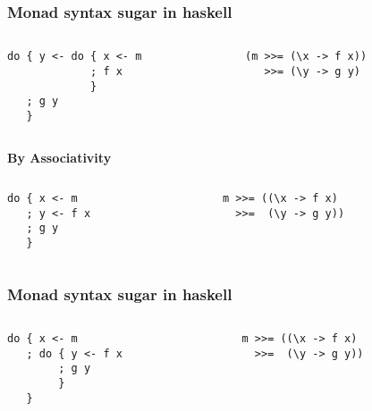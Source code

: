 \documentclass{beamer}
\begin{document}
\begin{frame}[fragile]
\frametitle{Monad syntax sugar in haskell}
\vspace{-0.5cm}
\begin{columns}[t]
  \begin{column}{5cm}
\begin{lstlisting}
do { y <- do { x <- m
             ; f x
             }
   ; g y 
   }
\end{lstlisting}
  \end{column}
  \begin{column}{5cm}
\begin{lstlisting}
(m >>= (\x -> f x)) 
   >>= (\y -> g y)
\end{lstlisting}
  \end{column}
\end{columns}

\pause

\begin{center}
\textbf{By Associativity}
\end{center}

\vspace{-0.5cm}
\begin{columns}[t]
  \begin{column}{5cm}
{
\begin{lstlisting}
do { x <- m
   ; y <- f x
   ; g y 
   }
\end{lstlisting}
}
  \end{column}
  \begin{column}{5cm}
{
\begin{lstlisting}
m >>= ((\x -> f x) 
  >>=  (\y -> g y))
\end{lstlisting}
}
  \end{column}
\end{columns}
\end{frame}

\begin{frame}[fragile]
\frametitle{Monad syntax sugar in haskell}
\vspace{-0.5cm}

\begin{columns}[t]
  \begin{column}{5cm}
\begin{lstlisting}
do { x <- m 
   ; do { y <- f x 
        ; g y 
        }
   }
\end{lstlisting}
  \end{column}
  \begin{column}{5cm}
\begin{lstlisting}
m >>= ((\x -> f x) 
  >>=  (\y -> g y))
\end{lstlisting}
  \end{column}
\end{columns}

\end{frame}
\end{document}
